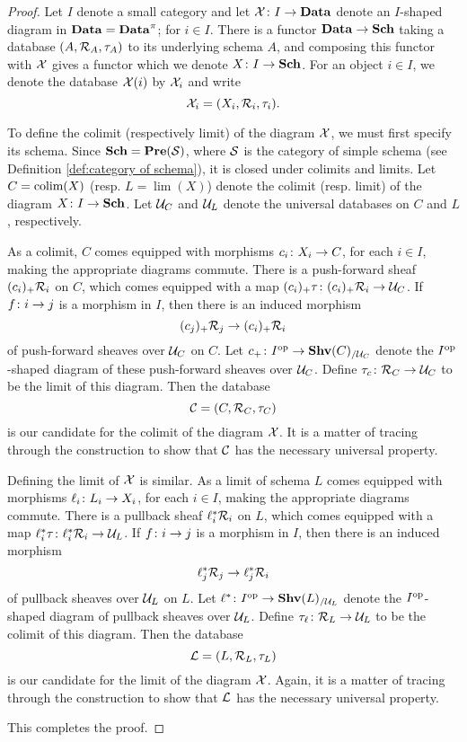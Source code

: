 \documentclass{amsart}
\def\Sch{{\bf Sch}}
\def\Data{{\bf Data}}
\begin{document}
\begin{proof}

Let $I$ denote a small category and let $\mcX\taking I\to\Data$ denote an $I$-shaped diagram in $\Data=\Data^\pi$; for $i\in I$.  There is a functor $\Data\to\Sch$ taking a database $(A,\mathcal{R}_A,\tau_A)$ to its underlying schema $A$, and composing this functor with $\mathcal{X}$ gives a functor which we denote $X\taking I\to\Sch$.  For an object $i\in I$, we denote the database $\mathcal{X}(i)$ by $\mathcal{X}_i$ and write $$\mathcal{X}_i=(X_i,\mathcal{R}_i,\tau_i).$$

To define the colimit (respectively limit) of the diagram $\mathcal{X}$, we must first specify its schema.  Since $\Sch=\Pre(\mcS)$, where $\mathcal{S}$ is the category of simple schema (see Definition \ref{def:category of schema}), it is closed under colimits and limits.  Let $C=\mathop{\textnormal{colim}}(X)$ (resp. $L=\lim(X)$) denote the colimit (resp. limit) of the diagram $X\taking I\to\Sch$.  Let $\mathcal{U}_C$ and $\mathcal{U}_L$ denote the universal databases on $C$ and $L$, respectively.

As a colimit, $C$ comes equipped with morphisms $c_i\colon X_i\rightarrow C$, for each $i\in I$, making the appropriate diagrams commute.  There is a push-forward sheaf $(c_i)_+\mathcal{R}_i$ on $C$, which comes equipped with a map $(c_i)_+\tau\colon (c_i)_+\mathcal{R}_i\rightarrow\mathcal{U}_C$.  If $f\colon i\rightarrow j$ is a morphism in $I$, then there is an induced morphism $$(c_j)_+\mathcal{R}_j\rightarrow (c_i)_+\mathcal{R}_i$$ of push-forward sheaves over $\mathcal{U}_C$ on $C$.  Let $c_+\colon I^\textnormal{op}\rightarrow{\bf Shv}(C)_{/\mathcal{U}_C}$ denote the $I^\textnormal{op}$-shaped diagram of these push-forward sheaves over $\mathcal{U}_C$.  Define $\tau_c\colon\mathcal{R}_C\rightarrow\mathcal{U}_C$ to be the limit of this diagram.  Then the database $$\mathcal{C}=(C,\mathcal{R}_C,\tau_C)$$ is our candidate for the colimit of the diagram $\mathcal{X}$.  It is a matter of tracing through the construction to show that $\mathcal{C}$ has the necessary universal property.

Defining the limit of $\mathcal{X}$ is similar.  As a limit of schema $L$ comes equipped with morphisms $\ell_i\colon L_i\rightarrow X_i$, for each $i\in I$, making the appropriate diagrams commute.  There is a pullback sheaf $\ell_i^*\mathcal{R}_i$ on $L$, which comes equipped with a map $\ell_i^*\tau\colon\ell_i^*\mathcal{R}_i\rightarrow\mathcal{U}_L$.  If $f\colon i\rightarrow j$ is a morphism in $I$, then there is an induced morphism $$\ell_j^*\mathcal{R}_j\rightarrow\ell_j^*\mathcal{R}_i$$ of pullback sheaves over $\mathcal{U}_L$ on $L$.  Let $\ell^*\colon I^\textnormal{op}\rightarrow{\bf Shv}(L)_{/\mathcal{U}_L}$ denote the $I^\textnormal{op}$-shaped diagram of pullback sheaves over $\mathcal{U}_L$.  Define $\tau_\ell\colon\mathcal{R}_L\rightarrow\mathcal{U}_L$ to be the colimit of this diagram.  Then the database $$\mathcal{L}=(L,\mathcal{R}_L,\tau_L)$$ is our candidate for the limit of the diagram $\mathcal{X}$.  Again, it is a matter of tracing through the construction to show that $\mathcal{L}$ has the necessary universal property.  

This completes the proof.

\end{proof}
\end{document}
